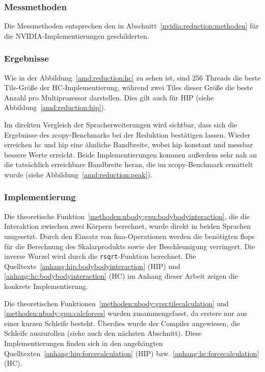 \subsubsection{Messmethoden}

Die Messmethoden entsprechen den in Abschnitt~\ref{nvidia:reduction:methoden}
für die NVIDIA-Implementierungen geschilderten.

\subsubsection{Ergebnisse}

Wie in der Abbildung~\ref{amd:reduction:hc} zu sehen ist, sind 256 Threads die
beste Tile-Größe der HC-Implementierung, während zwei Tiles dieser Größe die
beste Anzahl pro Multiprozessor darstellen. Dies gilt auch für HIP (siehe
Abbildung~\ref{amd:reduction:hip}).

Im direkten Vergleich der Spracherweiterungen wird sichtbar, dass sich die
Ergebnisse des zcopy-Benchmarks bei der Reduktion bestätigen lassen. Wieder
erreichen \gls{hc} und \gls{hip} eine ähnliche Bandbreite, wobei \gls{hip}
konstant und messbar bessere Werte erreicht. Beide Implementierungen kommen
außerdem sehr nah an die tatsächlich erreichbare Bandbreite heran, die im
zcopy-Benchmark ermittelt wurde (siehe Abbildung~\ref{amd:reduction:peak}).

\subsubsection{Implementierung}

Die theoretische Funktion~\ref{methoden:nbody:gpu:bodybodyinteraction}, die die
Interaktion zwischen zwei Körpern berechnet, wurde direkt in beiden Sprachen
umgesetzt. Durch den Einsatz von \gls{fma}-Operationen werden die benötigten
\gls{flops} für die Berechnung des Skalarprodukts sowie der Beschleunigung
verringert. Die inverse Wurzel wird durch die \texttt{rsqrt}-Funktion berechnet.
Die Quelltexte~\ref{anhang:hip:bodybodyinteraction} (HIP) und
\ref{anhang:hc:bodybodyinteraction} (HC) im Anhang dieser Arbeit zeigen die
konkrete Implementierung.

Die theoretischen Funktionen~\ref{methoden:nbody:gpu:tilecalculation} und
\ref{methoden:nbody:gpu:calcforces} wurden zusammengefasst, da erstere
nur aus einer kurzen Schleife besteht. Überdies wurde der Compiler angewiesen,
die Schleife auszurollen (siehe auch den nächsten Abschnitt). Diese
Implementierungen finden sich in den angehängten
Quelltexten~\ref{anhang:hip:forcecalculation} (HIP) bzw.
\ref{anhang:hc:forcecalculation} (HC).

